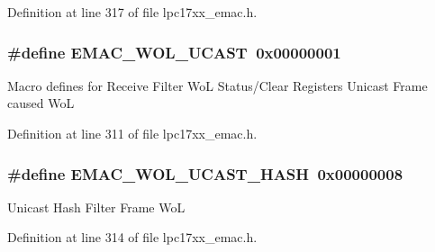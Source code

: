 \-Definition at line 317 of file lpc17xx\-\_\-emac.\-h.

\hypertarget{group___e_m_a_c___private___macros_ga6be87dee67b2d007de918c6203954000}{
\subsubsection[{\-E\-M\-A\-C\-\_\-\-W\-O\-L\-\_\-\-U\-C\-A\-S\-T}]{\setlength{\rightskip}{0pt plus 5cm}\#define {\bf \-E\-M\-A\-C\-\_\-\-W\-O\-L\-\_\-\-U\-C\-A\-S\-T}~0x00000001}}\label{group___e_m_a_c___private___macros_ga6be87dee67b2d007de918c6203954000}
\-Macro defines for \-Receive \-Filter \-Wo\-L \-Status/\-Clear \-Registers \-Unicast \-Frame caused \-Wo\-L 

\-Definition at line 311 of file lpc17xx\-\_\-emac.\-h.

\hypertarget{group___e_m_a_c___private___macros_ga45dd49bec8aea850bf2175c6cc834f4a}{
\subsubsection[{\-E\-M\-A\-C\-\_\-\-W\-O\-L\-\_\-\-U\-C\-A\-S\-T\-\_\-\-H\-A\-S\-H}]{\setlength{\rightskip}{0pt plus 5cm}\#define {\bf \-E\-M\-A\-C\-\_\-\-W\-O\-L\-\_\-\-U\-C\-A\-S\-T\-\_\-\-H\-A\-S\-H}~0x00000008}}\label{group___e_m_a_c___private___macros_ga45dd49bec8aea850bf2175c6cc834f4a}
\-Unicast \-Hash \-Filter \-Frame \-Wo\-L 

\-Definition at line 314 of file lpc17xx\-\_\-emac.\-h.

